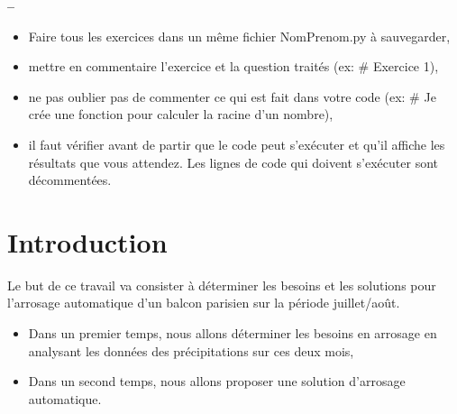


\usepackage{enumitem}







\begin{center}
{\Large\bf {\type} \no {\numero} -- \descrip}
\end{center}


\begin{boxedminipage}{.9\textwidth} 
\begin{itemize}
 \item Faire tous les exercices dans un même fichier {NomPrenom.py} à sauvegarder,
 \item mettre en commentaire l'exercice et la question traités (ex: \# Exercice 1),
 \item ne pas oublier pas de commenter ce qui est fait dans votre code (ex: \# Je crée une fonction pour calculer la racine d'un nombre),
 \item il faut vérifier avant de partir que le code peut s'exécuter et qu'il affiche les résultats que vous attendez. Les lignes de code qui doivent s'exécuter sont décommentées.
\end{itemize}
\end{boxedminipage}

\section*{Introduction}

Le but de ce travail va consister à déterminer les besoins et les solutions pour l'arrosage automatique d'un balcon parisien sur la période juillet/août.

\begin{itemize}
 \item Dans un premier temps, nous allons déterminer les besoins en arrosage en analysant les données des précipitations sur ces deux mois,
 \item Dans un second temps, nous allons proposer une solution d'arrosage automatique.
\end{itemize}

